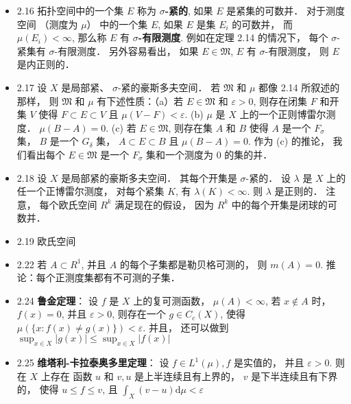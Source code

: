 \begin{itemize}
\item 2.16 拓扑空间中的一个集 $E$ 称为 \textbf{$\sigma$-紧的}, 如果 $E$ 是紧集的可数并． 对于测度空间 （测度为 $\mu$） 中的一个集 $E$, 如果 $E$ 是集 $E_{i}$ 的可数并， 而 $\mu\left(E_{i}\right)<\infty$, 那么称 $E$ 有 \textbf{$\sigma$-有限测度}. 例如在定理 2.14 的情况下， 每个 $\sigma$-紧集有 $\sigma$-有限测度． 另外容易看出， 如果 $E \in\mathfrak{M}$, $E$ 有 $\sigma$-有限测度， 则 $E$ 是内正则的．

\item 2.17 设 $X$ 是局部紧、 $\sigma$-紧的豪斯多夫空间． 若 $\mathfrak{M}$ 和 $\mu$ 都像 2.14 所叙述的那样， 则 $\mathfrak{M}$ 和 $\mu$ 有下述性质：（a）若 $E \in \mathfrak{M}$ 和 $\varepsilon>0$, 则存在闭集 $F$ 和开集 $V$ 使得 $F \subset E \subset V$ 且 $\mu(V-F)<\varepsilon$. (b) $\mu$ 是 $X$ 上的一个正则博雷尔测度． $\mu(B-A)=0$. (c) 若 $E \in \mathfrak{M}$, 则存在集 $A$ 和 $B$ 使得 $A$ 是一个 $F_{\sigma}$ 集， $B$ 是一个 $G_{\delta}$ 集， $A \subset E \subset B$ 且 $\mu(B-A)=0$. 作为 (c) 的推论， 我们看出每个 $E \in \mathfrak{M}$ 是一个 $F_\sigma$ 集和一个测度为 0 的集的并．

\item 2.18 设 $X$ 是局部紧的豪斯多夫空间． 其每个开集是 $\sigma$-紧的． 设 $\lambda$ 是 $X$ 上的任一个正博雷尔测度， 对每个紧集 $K$, 有 $\lambda(K)<\infty$. 则 $\lambda$ 是正则的． 注意， 每个欧氏空间 $R^{k}$ 满足现在的假设， 因为 $R^{k}$ 中的每个开集是闭球的可数并．

\item 2.19 欧氏空间

\item 2.22 若 $A \subset R^{1}$, 并且 $A$ 的每个子集都是勒贝格可测的， 则 $m(A)=0$. 推论：每个正测度集都有不可测的子集．

\item 2.24 \textbf{鲁金定理}： 设 $f$ 是 $X$ 上的复可测函数， $\mu(A)<\infty$, 若 $x \notin A$ 时， $f(x)=0$, 并且 $\varepsilon>0$, 则存在一个 $g \in C_{c}(X)$, 使得 $\mu(\{x: f(x) \neq g(x)\})<\varepsilon$. 并且， 还可以做到 $\sup _{x \in X}|g(x)| \leqslant \sup _{x \in X}|f(x)|$

\item 2.25 \textbf{维塔利-卡拉泰奥多里定理}： 设 $f \in L^{1}(\mu), f$ 是实值的， 并且 $\varepsilon>0$. 则在 $X$ 上存在 函数 $u$ 和 $v, u$ 是上半连续且有上界的， $v$ 是下半连续且有下界的， 使得 $u \leqslant f \leqslant v$, 且 $\int_{X}(v-u) \mathrm{d} \mu<\varepsilon$

\end{itemize}

